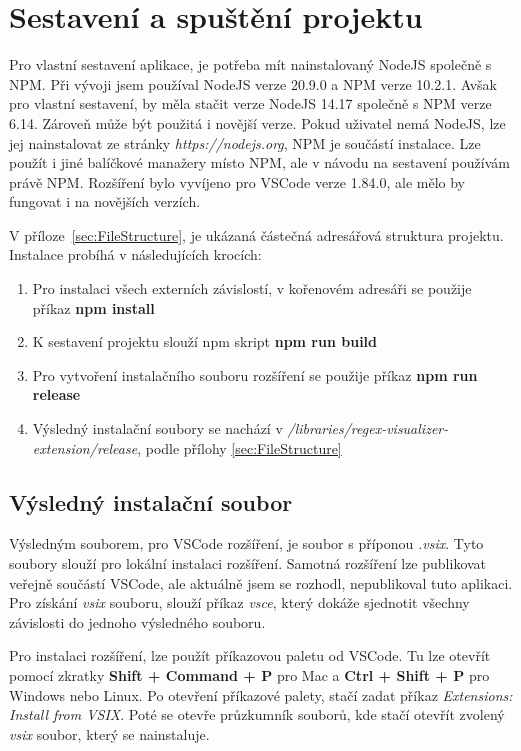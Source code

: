 \section{Sestavení a spuštění projektu}

Pro vlastní sestavení aplikace, je potřeba mít nainstalovaný NodeJS společně s NPM.
Při vývoji jsem používal NodeJS verze 20.9.0 a NPM verze 10.2.1.
Avšak pro vlastní sestavení, by měla stačit verze NodeJS 14.17 společně s NPM verze 6.14.
Zároveň může být použitá i novější verze. 
Pokud uživatel nemá NodeJS, lze jej nainstalovat ze stránky \textit{https://nodejs.org}, NPM je součástí instalace.
Lze použít i jiné balíčkové manažery místo NPM, ale v návodu na sestavení používám právě NPM.
Rozšíření bylo vyvíjeno pro VSCode verze 1.84.0, ale mělo by fungovat i na novějších verzích.

V příloze~\ref{sec:FileStructure}, je ukázaná částečná adresářová struktura projektu.
Instalace probíhá v následujících krocích:

\begin{enumerate}
	\item Pro instalaci všech externích závislostí, v kořenovém adresáři se použije příkaz \textbf{\textcolor{OliveGreen}{npm install}}
	\item K sestavení projektu slouží npm skript \textbf{\textcolor{OliveGreen}{npm run build}}
	\item Pro vytvoření instalačního souboru rozšíření se použije příkaz \textbf{\textcolor{OliveGreen}{npm run release}}
	\item Výsledný instalační soubory se nachází v \textit{/libraries/regex-visualizer-extension/release}, podle přílohy \ref{sec:FileStructure}
\end{enumerate}

\subsection*{Výsledný instalační soubor}

Výsledným souborem, pro VSCode rozšíření, je soubor s příponou \textit{.vsix}.
Tyto soubory slouží pro lokální instalaci rozšíření. 
Samotná rozšíření lze publikovat veřejně součástí VSCode, ale aktuálně jsem se rozhodl, nepublikoval tuto aplikaci.
Pro získání \textit{vsix} souboru, slouží příkaz \textit{vsce}, který dokáže sjednotit všechny závislosti do jednoho výsledného souboru.

Pro instalaci rozšíření, lze použít příkazovou paletu od VSCode.
Tu lze otevřít pomocí zkratky \textbf{Shift + Command + P} pro Mac a \textbf{Ctrl + Shift + P} pro Windows nebo Linux.
Po otevření příkazové palety, stačí zadat příkaz \textit{Extensions: Install from VSIX}.
Poté se otevře průzkumník souborů, kde stačí otevřít zvolený \textit{vsix} soubor, který se nainstaluje.

\endinput